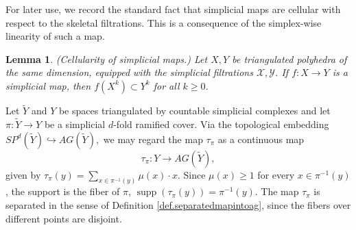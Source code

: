 \documentclass{amsart}
\newtheorem{lemma}[thm]{Lemma}
\theoremstyle{definition}
\theoremstyle{remark}
\newcommand {\Xa}    {\ensuremath{\mathcal{X}}}
\newcommand {\Ya}    {\ensuremath{\mathcal{Y}}}
\newcommand {\supp}  {\ensuremath{\operatorname{supp}}}
\begin{document}
For later use, we record the standard fact that simplicial maps are cellular
with respect to the skeletal filtrations. This is a consequence of the simplex-wise
linearity of such a map. 
\begin{lemma} \label{lem.simplicialmapiscellular}
(Cellularity of simplicial maps.)
Let $X,Y$ be triangulated polyhedra of the same dimension, equipped
with the simplicial filtrations $\Xa, \Ya$.
If $f:X\to Y$ is a simplicial map, then 
$f(X^k) \subset Y^k$
for all $k\geq 0$.
\end{lemma}

Let $\widetilde{Y}$ and $Y$ be spaces triangulated by countable
simplicial complexes and let $\pi: \widetilde{Y} \to Y$ be a
simplicial $d$-fold ramified cover.
Via the topological embedding
$SP^d (\widetilde{Y}) \hookrightarrow AG(\widetilde{Y}),$
we may regard the map $\tau_\pi$ as a continuous map
\[ \tau_\pi: Y \longrightarrow AG(\widetilde{Y}), \]
given by
$\tau_\pi (y) = \sum_{x\in \pi^{-1}(y)} \mu (x)\cdot x.$
Since $\mu (x)\geq 1$ for every $x\in \pi^{-1} (y)$,
the support is the fiber of $\pi$,
$\supp (\tau_\pi (y)) = \pi^{-1} (y).$
The map $\tau_\pi$ is separated in the sense of 
Definition \ref{def.separatedmapintoag},
since the fibers over different points are disjoint.
\end{document}
